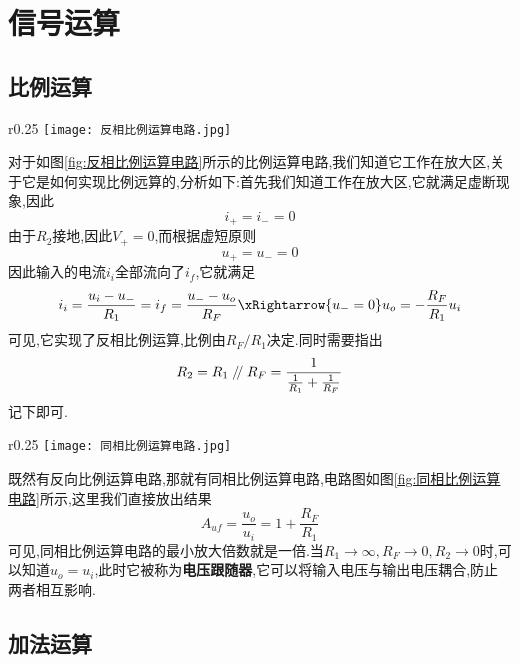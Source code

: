 \section{\K 信号运算}
\subsection{\K 比例运算}

\begin{wrapfigure}{r}{0.25\textwidth}
    \centering
    \texttt{[image: 反相比例运算电路.jpg]}
    \caption{反相比例运算电路}
    \label{fig:反相比例运算电路}
\end{wrapfigure}
\Par 对于如图\ref{fig:反相比例运算电路}所示的比例运算电路,我们知道它工作在放大区,关于它是如何实现比例远算的,分析如下:首先我们知道工作在放大区,它就满足虚断现象,因此
\begin{equation*}
    i_+=i_-=0
\end{equation*}
由于$R_2$接地,因此$V_+=0$,而根据虚短原则
\begin{equation*}
    u_+=u_-=0
\end{equation*}
因此输入的电流$i_i$全部流向了$i_f$,它就满足
\begin{equation}
    i_i=\frac{u_i-u_-}{R_1}=i_f=\frac{u_--u_o}{R_F}\xRightarrow{u_-=0}u_o=-\frac{R_F}{R_1}u_i
\end{equation}
可见,它实现了反相比例运算,比例由$R_F/R_1$决定.同时需要指出
\begin{equation}
    R_2=R_1\kern 0.56em/\kern -0.8em /\kern 0.56em R_F=\frac{1}{\frac{1}{R_1}+\frac{1}{R_F}}
\end{equation}
记下即可.

\begin{wrapfigure}{r}{0.25\textwidth}
    \centering
    \texttt{[image: 同相比例运算电路.jpg]}
    \caption{同相比例运算电路}
    \label{fig:同相比例运算电路}
\end{wrapfigure}
\Par 既然有反向比例运算电路,那就有同相比例运算电路,电路图如图\ref{fig:同相比例运算电路}所示,这里我们直接放出结果
\begin{equation}
    A_{uf}=\frac{u_o}{u_i}=1+\frac{R_F}{R_1}
\end{equation}
可见,同相比例运算电路的最小放大倍数就是一倍.当$R_1\rightarrow \infty ,R_F\rightarrow 0,R_2\rightarrow 0$时,可以知道$u_o=u_i$,此时它被称为\textbf{电压跟随器},它可以将输入电压与输出电压耦合,防止两者相互影响.

\subsection{\K 加法运算}

